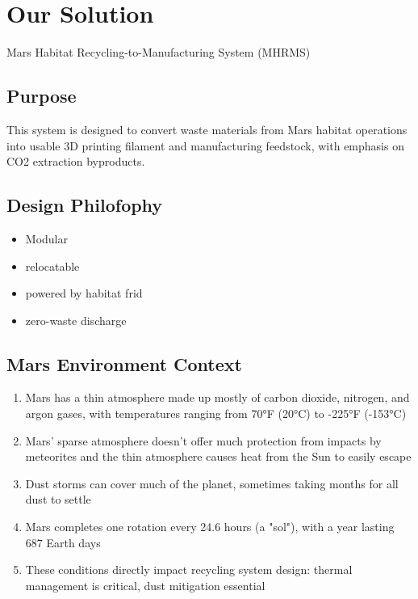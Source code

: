 \documentclass[12pt, a4paper]{article}
\begin{document}
\section{Our Solution}
Mars Habitat Recycling-to-Manufacturing System (MHRMS)
\subsection{Purpose}
This system is designed to convert waste materials from
Mars habitat operations into usable 3D printing filament and
manufacturing feedstock, with emphasis on CO2 extraction 
byproducts. 

\subsection{Design Philofophy}
\begin{itemize}
    \item Modular
    \item relocatable
    \item powered by habitat frid
    \item zero-waste discharge
\end{itemize}

\subsection{Mars Environment Context}
\begin{enumerate}
    \item Mars has a thin atmosphere made up mostly of carbon dioxide, nitrogen, and argon gases, with temperatures ranging from 70°F (20°C) to -225°F (-153°C)
    \item Mars' sparse atmosphere doesn't offer much protection from impacts by meteorites and the thin atmosphere causes heat from the Sun to easily escape
    \item Dust storms can cover much of the planet, sometimes taking months for all dust to settle
    \item Mars completes one rotation every 24.6 hours (a "sol"), with a year lasting 687 Earth days
    \item These conditions directly impact recycling system design: thermal management is critical, dust mitigation essential
\end{enumerate}
\end{document}
